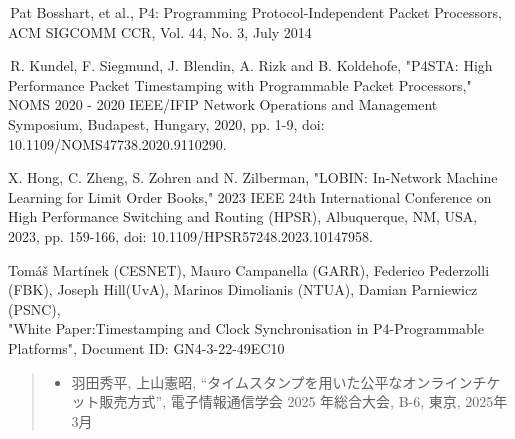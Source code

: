 \documentclass[a4j,11pt]{jreport}
\begin{document}
\begin{thebibliography}{99}
  \footnotesize
  \baselineskip 3.1mm

  \,Pat Bosshart, et al.,
  P4: Programming Protocol-Independent Packet Processors, ACM SIGCOMM CCR, Vol. 44, No. 3, July 2014

  \,R. Kundel, F. Siegmund, J. Blendin, A. Rizk and B. Koldehofe, "P4STA: High Performance Packet Timestamping with Programmable Packet Processors," NOMS 2020 - 2020 IEEE/IFIP Network Operations and Management Symposium, Budapest, Hungary, 2020, pp. 1-9, doi: 10.1109/NOMS47738.2020.9110290.

  X. Hong, C. Zheng, S. Zohren and N. Zilberman, "LOBIN: In-Network Machine Learning for Limit Order Books," 2023 IEEE 24th International Conference on High Performance Switching and Routing (HPSR), Albuquerque, NM, USA, 2023, pp. 159-166, doi: 10.1109/HPSR57248.2023.10147958.

  Tomáš Martínek (CESNET), Mauro Campanella (GARR), Federico Pederzolli (FBK), Joseph Hill(UvA), Marinos Dimolianis (NTUA), Damian Parniewicz (PSNC), \\"White Paper:Timestamping and Clock Synchronisation in P4-Programmable Platforms", Document ID: GN4-3-22-49EC10
\end{thebibliography}

\begin{quote}
  \begin{itemize}
    \item
          羽田秀平, 上山憲昭, “タイムスタンプを用いた公平なオンラインチケット販売方式”, 電子情報通信学会 2025 年総合大会, B-6, 東京, 2025年3月
  \end{itemize}
\end{quote}
\end{document}
